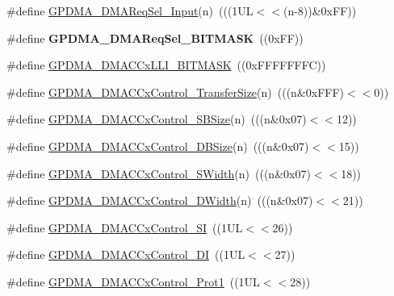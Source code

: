 \begin{DoxyCompactItemize}
\item 
\#define \hyperlink{group___g_p_d_m_a___private___macros_gaef3ed3321c8e74d15b3edc72b1d579c9}{\-G\-P\-D\-M\-A\-\_\-\-D\-M\-A\-Req\-Sel\-\_\-\-Input}(n)~(((1\-U\-L$<$$<$(n-\/8))\&0x\-F\-F))
\item 
\hypertarget{group___g_p_d_m_a___private___macros_gab4539f74508d196d9e1d3ea74df28e9f}{\#define {\bfseries \-G\-P\-D\-M\-A\-\_\-\-D\-M\-A\-Req\-Sel\-\_\-\-B\-I\-T\-M\-A\-S\-K}~((0x\-F\-F))}\label{group___g_p_d_m_a___private___macros_gab4539f74508d196d9e1d3ea74df28e9f}

\item 
\#define \hyperlink{group___g_p_d_m_a___private___macros_ga109fe41c2d34a46fc9f46c975979a7f6}{\-G\-P\-D\-M\-A\-\_\-\-D\-M\-A\-C\-Cx\-L\-L\-I\-\_\-\-B\-I\-T\-M\-A\-S\-K}~((0x\-F\-F\-F\-F\-F\-F\-F\-C))
\item 
\#define \hyperlink{group___g_p_d_m_a___private___macros_ga0e3ee35f724f4ef0cc8e91dfaec761e4}{\-G\-P\-D\-M\-A\-\_\-\-D\-M\-A\-C\-Cx\-Control\-\_\-\-Transfer\-Size}(n)~(((n\&0x\-F\-F\-F)$<$$<$0))
\item 
\#define \hyperlink{group___g_p_d_m_a___private___macros_ga1f5c9d534965c6a89ea22ca3fa48d859}{\-G\-P\-D\-M\-A\-\_\-\-D\-M\-A\-C\-Cx\-Control\-\_\-\-S\-B\-Size}(n)~(((n\&0x07)$<$$<$12))
\item 
\#define \hyperlink{group___g_p_d_m_a___private___macros_ga18c40b7931f0b6cfe8b81f9a982c0641}{\-G\-P\-D\-M\-A\-\_\-\-D\-M\-A\-C\-Cx\-Control\-\_\-\-D\-B\-Size}(n)~(((n\&0x07)$<$$<$15))
\item 
\#define \hyperlink{group___g_p_d_m_a___private___macros_ga2ee63289c5e248a07ea901e233e1dd00}{\-G\-P\-D\-M\-A\-\_\-\-D\-M\-A\-C\-Cx\-Control\-\_\-\-S\-Width}(n)~(((n\&0x07)$<$$<$18))
\item 
\#define \hyperlink{group___g_p_d_m_a___private___macros_ga67bb6ed286afe6d4091c0fcd8799b451}{\-G\-P\-D\-M\-A\-\_\-\-D\-M\-A\-C\-Cx\-Control\-\_\-\-D\-Width}(n)~(((n\&0x07)$<$$<$21))
\item 
\#define \hyperlink{group___g_p_d_m_a___private___macros_gaa9b006e86536835dfe6f7034ee25d12a}{\-G\-P\-D\-M\-A\-\_\-\-D\-M\-A\-C\-Cx\-Control\-\_\-\-S\-I}~((1\-U\-L$<$$<$26))
\item 
\#define \hyperlink{group___g_p_d_m_a___private___macros_gaddcec41c911bbd0911391e6195c1c040}{\-G\-P\-D\-M\-A\-\_\-\-D\-M\-A\-C\-Cx\-Control\-\_\-\-D\-I}~((1\-U\-L$<$$<$27))
\item 
\#define \hyperlink{group___g_p_d_m_a___private___macros_ga883ee41e16f8df248437075cebab7993}{\-G\-P\-D\-M\-A\-\_\-\-D\-M\-A\-C\-Cx\-Control\-\_\-\-Prot1}~((1\-U\-L$<$$<$28))

\end{DoxyCompactItemize}
